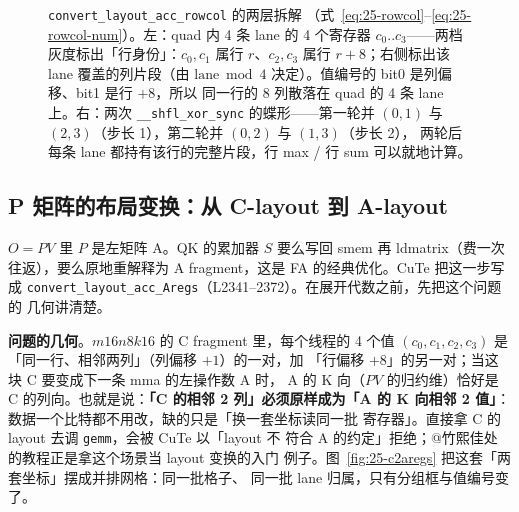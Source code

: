 \begin{figure}[H]
\caption{\texttt{convert\_\allowbreak{}layout\_\allowbreak{}acc\_\allowbreak{}rowcol} 的两层拆解
（式~\eqref{eq:25-rowcol}--\eqref{eq:25-rowcol-num}）。左：quad 内 4 条 lane 的 4 个寄存器
$c_0..c_3$——两档灰度标出「行身份」：$c_0,c_1$ 属行 $r$、$c_2,c_3$ 属行 $r{+}8$；右侧标出该 lane
覆盖的列片段（由 $\mathrm{lane}\bmod4$ 决定）。值编号的 bit0 是列偏移、bit1 是行 $+8$，所以
同一行的 8 列散落在 quad 的 4 条 lane 上。右：两次 \texttt{\_\allowbreak{}\_\allowbreak{}shfl\_\allowbreak{}xor\_\allowbreak{}sync}
的蝶形——第一轮并 $(0,1)$ 与 $(2,3)$（步长 1），第二轮并 $(0,2)$ 与 $(1,3)$（步长 2），
两轮后每条 lane 都持有该行的完整片段，行 max / 行 sum 可以就地计算。}
\label{fig:25-rowcol-shfl}
\end{figure}

\subsection{P 矩阵的布局变换：从 C-layout 到 A-layout}

$O=PV$ 里 $P$ 是左矩阵 A。QK 的累加器 $S$ 要么写回 smem 再 ldmatrix（费一次
往返），要么原地重解释为 A fragment，这是 FA 的经典优化。CuTe 把这一步写成
\texttt{convert\_\allowbreak{}layout\_\allowbreak{}acc\_\allowbreak{}Aregs}（L2341--2372）。在展开代数之前，先把这个问题的
几何讲清楚。

\textbf{问题的几何}。$m16n8k16$ 的 C fragment 里，每个线程的 4 个值
$(c_0,c_1,c_2,c_3)$ 是「同一行、相邻两列」（列偏移 $+1$）的一对，加
「行偏移 $+8$」的另一对；当这块 C 要变成下一条 mma 的左操作数 A 时，
A 的 K 向（$PV$ 的归约维）恰好是 C 的列向。也就是说：\textbf{「C 的相邻 2 列」必须原样成为「A 的
K 向相邻 2 值」}：数据一个比特都不用改，缺的只是「换一套坐标读同一批
寄存器」。直接拿 C 的 layout 去调 \texttt{gemm}，会被 CuTe 以「layout 不
符合 A 的约定」拒绝；@竹熙佳处 的教程正是拿这个场景当 layout 变换的入门
例子。图~\ref{fig:25-c2aregs} 把这套「两套坐标」摆成并排网格：同一批格子、
同一批 lane 归属，只有分组框与值编号变了。

